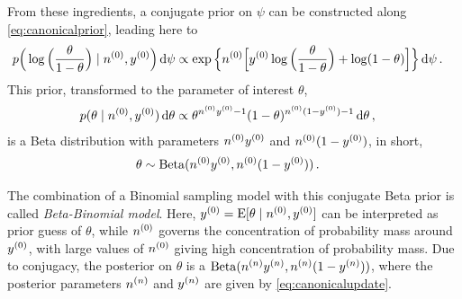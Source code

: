From these ingredients, a conjugate prior on $\psi$ can be constructed along \eqref{eq:canonicalprior},
leading here to
\begin{align*}
p\Big(\log\Big(\frac{\theta}{1-\theta}\Big) \mid \nz, \yz\Big) \dd\psi %
 &\propto \exp\Big\{ \nz \Big[ \yz \log\Big(\frac{\theta}{1-\theta}\Big) + \log(1-\theta) \Big] \Big\} \dd\psi\,.
\end{align*}
This prior, transformed to the parameter of interest $\theta$,
\begin{align*}
p(\theta\mid n^{(0)}, y^{(0)})\,\mathrm{d}\theta &\propto \theta^{n^{(0)}y^{(0)} - 1} (1-\theta)^{n^{(0)}(1-y^{(0)}) - 1} \,\mathrm{d}\theta\,,
\end{align*}
is a Beta distribution with parameters $n^{(0)}y^{(0)}$ and $n^{(0)}(1-y^{(0)})$, in short, %
\begin{align*}
\theta &\sim \operatorname{Beta}(n^{(0)}y^{(0)}, n^{(0)}(1-y^{(0)}))\,.
\end{align*}

The combination of a Binomial sampling model with this conjugate Beta prior is called \emph{Beta-Binomial model}.
Here, $y^{(0)} = \operatorname{E}[\theta\mid n^{(0)}, y^{(0)}]$ can be interpreted as prior guess of $\theta$,
while $n^{(0)}$ governs the concentration of probability mass around $y^{(0)}$,
with large values of $n^{(0)}$ giving high concentration of probability mass.
Due to conjugacy, the posterior on $\theta$ is a $\operatorname{Beta}(n^{(n)}y^{(n)}, n^{(n)}(1-y^{(n)}))$,
where the posterior parameters $n^{(n)}$ and $y^{(n)}$ are given by \eqref{eq:canonicalupdate}.

